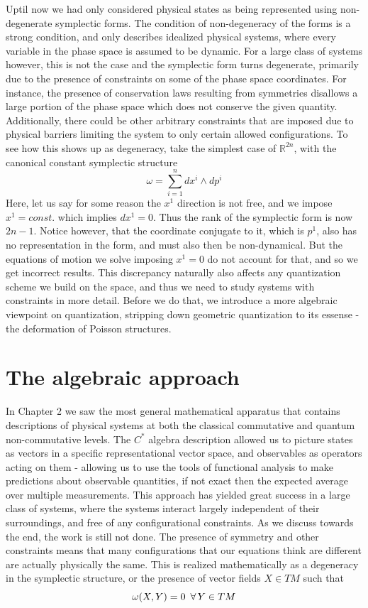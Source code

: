 \documentclass[
  12pt,
  a4paper, oneside
]{report}
\theoremstyle{bolddef}
\theoremstyle{remark}
\numberwithin{equation}{chapter}
\begin{document}
Uptil now we had only considered physical states as being represented using non-degenerate symplectic forms. The condition of non-degeneracy of the forms is a strong condition, and only describes idealized physical systems, where every variable in the phase space is assumed to be dynamic. For a large class of systems however, this is not the case and the symplectic form turns degenerate, primarily due to the presence of constraints on some of the phase space coordinates. For instance, the presence of conservation laws resulting from symmetries disallows a large portion of the phase space which does not conserve the given quantity. Additionally, there could be other arbitrary constraints that are imposed due to physical barriers limiting the system to only certain allowed configurations. To see how this shows up as degeneracy, take the simplest case of $\mathbb{R}^{2n}$, with the canonical constant symplectic structure 
$$
\omega =  \sum_{i= 1}^{n} dx^{i} \wedge dp^{i}
$$ 
Here, let us say for some reason the $x^{1}$ direction is not free, and we impose $x^{1} = const.$ which implies $dx^{1} = 0$. Thus the rank of the symplectic form is now $2n-1$. Notice however, that the coordinate conjugate to it, which is $p^{1}$, also has no representation in the form, and must also then be non-dynamical. But the equations of motion we solve imposing $x^{1} = 0$ do not account for that, and so we get incorrect results. This discrepancy naturally also affects any quantization scheme we build on the space, and thus we need to study systems with constraints in more detail. Before we do that, we introduce a more algebraic viewpoint on quantization, stripping down geometric quantization to its essense - the deformation of Poisson structures.

\chapter{The algebraic approach}
In Chapter 2 we saw the most general mathematical apparatus that contains descriptions of physical systems at both the classical commutative and quantum non-commutative levels. The $C^{*}$ algebra description allowed us to picture states as vectors in a specific representational vector space, and observables as operators acting on them - allowing us to use the tools of functional analysis to make predictions about observable quantities, if not exact then the expected average over multiple measurements. This approach has yielded great success in a large class of systems, where the systems interact largely independent of their surroundings, and free of any configurational constraints. As we discuss towards the end, the work is still not done. The presence of symmetry and other constraints means that many configurations that our equations think are different are actually physically the same. This is realized mathematically as a degeneracy in the symplectic structure, or the presence of vector fields $X \in TM$ such that 
$$
\omega(X,Y) = 0 \enskip \forall \, Y \in TM
$$
\end{document}
